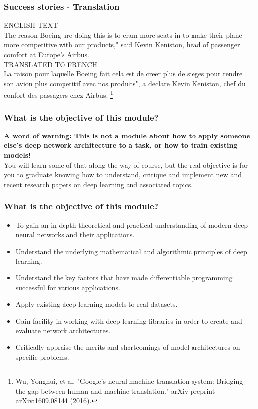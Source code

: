 \documentclass[\beamerclass]{beamer}
\newcommand\blfootnote[1]{%
  \begingroup
  \renewcommand\thefootnote{}\footnote{#1}%
  \addtocounter{footnote}{-1}%
  \endgroup
}
\begin{document}
\begin{frame}
	\frametitle{Success stories - Translation}

ENGLISH TEXT\\
The reason Boeing are doing this is to cram more seats in to make their plane
more competitive with our products," said Kevin Keniston, head of passenger
comfort at Europe's Airbus.
\\[1em]
TRANSLATED TO FRENCH\\
La raison pour laquelle Boeing fait cela est de creer plus de sieges pour rendre
son avion plus competitif avec nos produits", a declare Kevin Keniston, chef
du confort des passagers chez Airbus. \blfootnote{Wu, Yonghui, et al. "Google's neural machine translation system: Bridging the gap between human and machine translation." arXiv preprint arXiv:1609.08144 (2016).}

\end{frame}

\begin{frame}
	\frametitle{What is the objective of this module?}
	
	\textbf{A word of warning: This is not a module about how to apply someone else's deep network architecture to a task, or how to train existing models!}
	\\[1em]
	You will learn some of that along the way of course, but the real objective is for you to graduate knowing how to understand, critique and implement new and recent research papers on deep learning and associated topics.
\end{frame}

\begin{frame}
	\frametitle{What is the objective of this module?}
	\begin{itemize}
		\item<+-> To gain an in-depth theoretical and practical understanding of modern deep neural networks and their applications.
		\item<+-> Understand the underlying mathematical and algorithmic principles of deep learning.
		\item<+-> Understand the key factors that have made differentiable programming successful for various applications.
		\item<+-> Apply existing deep learning models to real datasets.
		\item<+-> Gain facility in working with deep learning libraries in order to create and evaluate network architectures.
		\item<+-> Critically appraise the merits and shortcomings of model architectures on specific problems.
	\end{itemize}
\end{frame}
\end{document}
